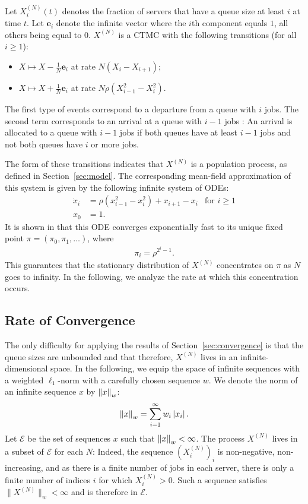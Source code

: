 \documentclass[sigconf]{acmart}
\newcommand\XN{X^{(N)}}
\newcommand\E{\mathcal{E}}
\newcommand\norm[1]{{\mathchoice{\bnorm{#1}}{\snorm{#1}}{\snorm{#1}}{\snorm{#1}}}}
\newcommand\bnorm[1]{\left\|#1\right\|}
\newcommand\snorm[1]{\|#1\|}
\newcommand\abs[1]{\left|#1\right|}
\begin{document}
Let $\XN_i(t)$ denotes the fraction of servers that have a queue size
at least $i$ at time $t$. Let $\mathbf{e}_i$ denote the infinite
vector where the $i$th component equals $1$, all others being equal to
$0$.  $\XN$ is a CTMC with the following transitions (for all
$i\ge1$):
\begin{itemize}
\item $X \mapsto X-\frac{1}{N}\mathbf{e}_i$ at rate $N(X_{i}-X_{i+1})$;
\item $X \mapsto X+\frac1N\mathbf{e}_i$ at rate
  $N\rho(X^2_{i-1}-X^2_{i})$.
\end{itemize}
The first type of events correspond to a departure from a queue with
$i$ jobs. The second term corresponds to an arrival at a queue with
$i-1$ jobs : An arrival is allocated to a queue with $i-1$ jobs if
both queues have at least $i-1$ jobs and not both queues have $i$ or
more jobs.

The form of these transitions indicates that $\XN$ is a population
process, as defined in Section~\ref{sec:model}. The corresponding
mean-field approximation of this system is given by the following
infinite system of ODEs:
\begin{align*}
  \dot{x}_i &= \rho(x^2_{i-1}-x_i^2) + x_{i+1}-x_{i}
  &\text{for $i\ge1$}\\
  x_0 &= 1.
\end{align*}
It is shown in \cite{mitzenmacher1996power} that this ODE converges
exponentially fast to its unique fixed point
$\pi=(\pi_0,\pi_1,\dots)$, where
\begin{align*}
  \pi_{i} = \rho^{2^i-1}.  
\end{align*}
This guarantees that the stationary distribution of $\XN$ concentrates
on $\pi$ as $N$ goes to infinity.  In the following, we analyze the
rate at which this concentration occurs. 


\subsection{Rate of Convergence} 

The only difficulty for applying the results of
Section~\ref{sec:convergence} is that the queue sizes are unbounded
and that therefore, $\XN$ lives in an infinite-dimensional space. In
the following, we equip the space of infinite sequences with a
weighted $\ell_1$-norm with a carefully chosen sequence $w$. We denote
the norm of an infinite sequence $x$ by $\norm{x}_w$:
\begin{align*}
  \norm{x}_w=\sum_{i=1}^\infty w_i\abs{x_i}.
\end{align*}
Let $\E$ be the set of sequences $x$ such that $\norm{x}_w<\infty$.
The process $\XN$ lives in a subset of $\E$ for each $N$: Indeed, the
sequence $(\XN_i)_i$ is non-negative, non-increasing, and as there is
a finite number of jobs in each server, there is only a finite number
of indices $i$ for which $\XN_i>0$. Such a sequence satisfies
$\snorm{\XN}_w<\infty$ and is therefore in $\E$.
\end{document}
